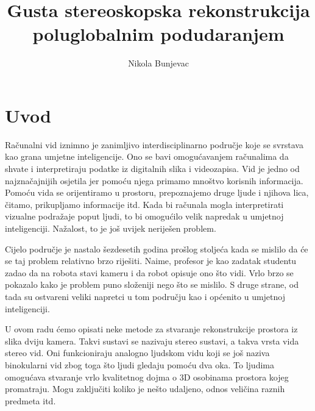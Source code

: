 \documentclass[utf8, zavrsni, numeric]{fer}
\begin{document}


\title{Gusta stereoskopska rekonstrukcija poluglobalnim podudaranjem}

\author{Nikola Bunjevac}

\maketitle

\izvornik

\zahvala{}

\tableofcontents

\chapter{Uvod}
Računalni vid iznimno je zanimljivo interdisciplinarno područje koje se svrstava kao grana umjetne inteligencije.
Ono se bavi omogućavanjem računalima da shvate i interpretiraju podatke iz digitalnih slika i videozapisa.
Vid je jedno od najznačajnijih osjetila jer pomoću njega primamo mnoštvo korisnih informacija.
Pomoću vida se orijentiramo u prostoru, prepoznajemo druge ljude i njihova lica, čitamo, prikupljamo informacije itd.
Kada bi računala mogla interpretirati vizualne podražaje poput ljudi, to bi omogućilo velik
napredak u umjetnoj inteligenciji. Nažalost, to je još uvijek neriješen problem.

Cijelo područje
je nastalo šezdesetih godina prošlog stoljeća kada se mislilo da će se taj problem relativno brzo riješiti.
Naime, profesor je kao zadatak studentu zadao da na robota stavi kameru i da robot opisuje ono što vidi.
Vrlo brzo se pokazalo kako je problem puno složeniji nego što se mislilo.
S druge strane, od tada su ostvareni veliki napretci u tom području kao i općenito u umjetnoj inteligenciji.

U ovom radu ćemo opisati neke metode za stvaranje rekonstrukcije prostora iz slika dviju kamera. Takvi sustavi se nazivaju stereo sustavi, a takva vrsta vida stereo vid.
Oni funkcioniraju analogno ljudskom vidu koji se još naziva binokularni vid zbog toga što ljudi gledaju pomoću dva oka. To ljudima omogućava stvaranje vrlo kvalitetnog dojma o 3D osobinama prostora kojeg promatraju. Mogu zaključiti koliko je nešto udaljeno, odnos veličina raznih predmeta itd.
\end{document}
